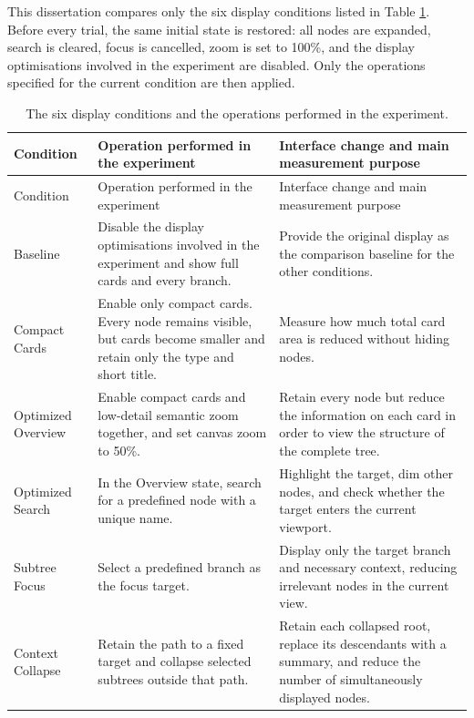 This dissertation compares only the six display conditions listed in Table \ref{tab:displayconditions}. Before every trial, the same initial state is restored: all nodes are expanded, search is cleared, focus is cancelled, zoom is set to 100\%, and the display optimisations involved in the experiment are disabled. Only the operations specified for the current condition are then applied.

\begin{longtable}{p{}p{}p{}}
\caption{The six display conditions and the operations performed in the experiment.}\label{tab:displayconditions}\\
\toprule Condition & Operation performed in the experiment & Interface change and main measurement purpose \\ \midrule\endfirsthead
\toprule Condition & Operation performed in the experiment & Interface change and main measurement purpose \\ \midrule\endhead
Baseline & Disable the display optimisations involved in the experiment and show full cards and every branch. & Provide the original display as the comparison baseline for the other conditions.\\
Compact Cards & Enable only compact cards. Every node remains visible, but cards become smaller and retain only the type and short title. & Measure how much total card area is reduced without hiding nodes.\\
Optimized Overview & Enable compact cards and low-detail semantic zoom together, and set canvas zoom to 50\%. & Retain every node but reduce the information on each card in order to view the structure of the complete tree.\\
Optimized Search & In the Overview state, search for a predefined node with a unique name. & Highlight the target, dim other nodes, and check whether the target enters the current viewport.\\
Subtree Focus & Select a predefined branch as the focus target. & Display only the target branch and necessary context, reducing irrelevant nodes in the current view.\\
Context Collapse & Retain the path to a fixed target and collapse selected subtrees outside that path. & Retain each collapsed root, replace its descendants with a summary, and reduce the number of simultaneously displayed nodes.\\
\bottomrule
\end{longtable}

